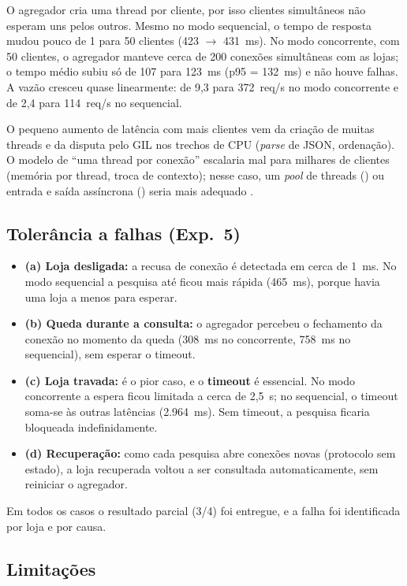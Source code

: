 O agregador cria uma thread por cliente, por isso clientes simultâneos não esperam uns pelos outros. Mesmo no modo sequencial, o tempo de resposta mudou pouco de 1 para 50 clientes (423 $\rightarrow$ 431~ms). No modo concorrente, com 50 clientes, o agregador manteve cerca de 200 conexões simultâneas com as lojas; o tempo médio subiu só de 107 para 123~ms (p95 = 132~ms) e não houve falhas. A vazão cresceu quase linearmente: de 9,3 para 372~req/s no modo concorrente e de 2,4 para 114~req/s no sequencial.

O pequeno aumento de latência com mais clientes vem da criação de muitas threads e da disputa pelo GIL nos trechos de CPU (\textit{parse} de JSON, ordenação). O modelo de ``uma thread por conexão'' escalaria mal para milhares de clientes (memória por thread, troca de contexto); nesse caso, um \textit{pool} de threads () ou entrada e saída assíncrona () seria mais adequado \cite{tanenbaum2007}.

\subsection{Tolerância a falhas (Exp.~5)}

\begin{itemize}
  \item \textbf{(a) Loja desligada:} a recusa de conexão é detectada em cerca de 1~ms. No modo sequencial a pesquisa até ficou mais rápida (465~ms), porque havia uma loja a menos para esperar.
  \item \textbf{(b) Queda durante a consulta:} o agregador percebeu o fechamento da conexão no momento da queda (308~ms no concorrente, 758~ms no sequencial), sem esperar o timeout.
  \item \textbf{(c) Loja travada:} é o pior caso, e o \textbf{timeout} é essencial. No modo concorrente a espera ficou limitada a cerca de 2,5~s; no sequencial, o timeout soma-se às outras latências (2.964~ms). Sem timeout, a pesquisa ficaria bloqueada indefinidamente.
  \item \textbf{(d) Recuperação:} como cada pesquisa abre conexões novas (protocolo sem estado), a loja recuperada voltou a ser consultada automaticamente, sem reiniciar o agregador.
\end{itemize}

Em todos os casos o resultado parcial (3/4) foi entregue, e a falha foi identificada por loja e por causa.

\subsection{Limitações}

